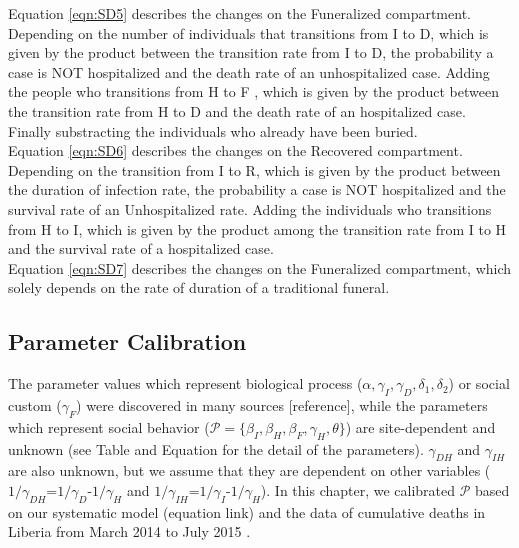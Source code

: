Equation \ref{eqn:SD5} describes the changes on the Funeralized compartment.  Depending on the number of individuals that transitions from I to D, which is given by the product between the transition rate from I to D, the probability a case is NOT hospitalized and the death rate of an unhospitalized case. Adding the people who transitions from H to F , which is given by the product between the transition rate from H to D and the death rate of an hospitalized case. Finally substracting the individuals who already have been buried.\\

Equation \ref{eqn:SD6} describes the changes on the Recovered compartment. Depending on the transition from I to R, which is given by the product between the duration of infection rate, the probability a case is NOT hospitalized and the survival rate of an Unhospitalized rate. Adding  the individuals who transitions from H to I, which is given by the product among the transition rate from I to H and the survival rate of a hospitalized case.\\

Equation \ref{eqn:SD7} describes the changes on the Funeralized compartment, which solely depends on the rate of duration of a traditional funeral.\\





\subsection{Parameter Calibration}

The parameter values which represent biological process ($\alpha, \gamma_{I}, \gamma_{D}, \delta_{1}, \delta_{2}$) or social custom ($\gamma_{F}$) were discovered in many sources [reference], while the parameters which represent social behavior ($\mathcal{P}=\{\beta_{I}, \beta_{H}, \beta_{F}, \gamma_{H}, \theta\}$) are site-dependent and unknown (see Table and Equation for the detail of the parameters). $\gamma_{DH}$ and $\gamma_{IH}$ are also unknown, but we assume that they are dependent on other variables ($1/\gamma_{DH}$=$1/\gamma_{D}$-$1/\gamma_{H}$ and $1/\gamma_{IH}$=$1/\gamma_{I}$-$1/\gamma_{H}$). In this chapter, we calibrated $\mathcal{P}$ based on our systematic model (equation link) and the data of cumulative deaths in Liberia from March 2014 to July 2015 \cite{CDCData}.\\



